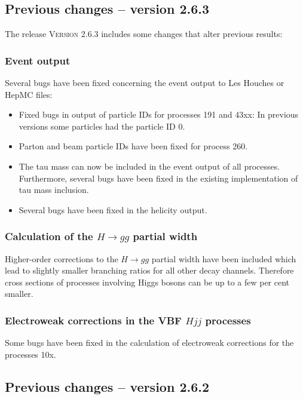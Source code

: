 \documentclass[english,12pt]{article}
\begin{document}
\subsection{Previous changes -- version 2.6.3}


The release \textsc{Version 2.6.3} includes some changes that alter previous results:

\subsubsection{Event output}

Several bugs have been fixed concerning the event output to Les Houches or HepMC files:
\begin{itemize}
 \item Fixed bugs in output of particle IDs for processes 191 and 43xx: In previous versions
       some particles had the particle ID 0.
 \item Parton and beam particle IDs have been fixed for process 260.
 \item The tau mass can now be included in the event output of all processes. Furthermore,
       several bugs have been fixed in the existing implementation of tau mass inclusion.
 \item Several bugs have been fixed in the helicity output.
\end{itemize}

\subsubsection{Calculation of the $H\to gg$ partial width}

Higher-order corrections to the $H\to gg$ partial width have been included which lead to slightly smaller
branching ratios for all other decay channels. Therefore cross sections of processes involving Higgs bosons
can be up to a few per cent smaller.

\subsubsection{Electroweak corrections in the VBF $Hjj$ processes}

Some bugs have been fixed in the calculation of electroweak corrections for the processes 10x.



\subsection{Previous changes -- version 2.6.2}
\end{document}

